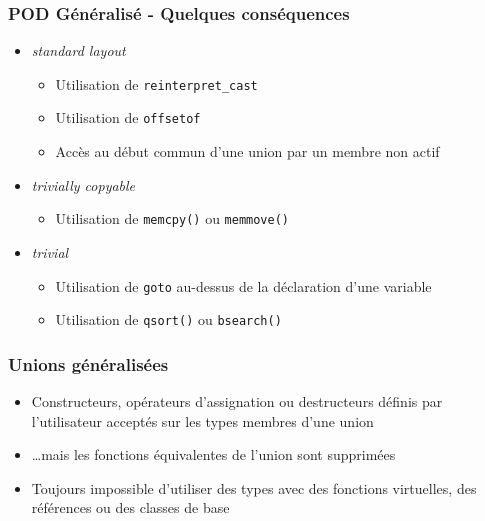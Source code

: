 \documentclass[C++.tex]{subfiles}
\begin{document}
\begin{frame}[fragile]
	\frametitle{POD Généralisé - Quelques conséquences}
	\begin{itemize}
		\item \textit{standard layout}
		\begin{itemize}
			\item Utilisation de \lstinline|reinterpret_cast|
			\item Utilisation de \lstinline|offsetof|
			\item Accès au début commun d'une union par un membre non actif
		\end{itemize}
	
		\item \textit{trivially copyable}
		\begin{itemize}
			\item Utilisation de \lstinline|memcpy()| ou \lstinline|memmove()|
		\end{itemize}

		\item \textit{trivial}
		\begin{itemize}
			\item Utilisation de \lstinline|goto| \og au-dessus\fg{} de la déclaration d'une variable
			\item Utilisation de \lstinline|qsort()| ou \lstinline|bsearch()|
		\end{itemize}
	\end{itemize}
\end{frame}

\begin{frame}[fragile]
	\frametitle{Unions généralisées}
	\begin{itemize}
		\item Constructeurs, opérateurs d'assignation ou destructeurs définis par l'utilisateur acceptés sur les types membres d'une union
		\item \ldots mais les fonctions équivalentes de l'union sont supprimées


		\item Toujours impossible d'utiliser des types avec des fonctions virtuelles, des références ou des classes de base
	\end{itemize}
\end{frame}
\end{document}
